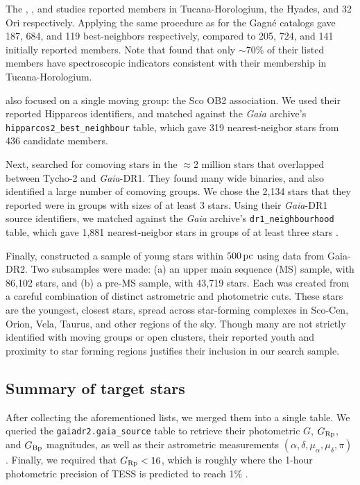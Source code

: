 \documentclass[12pt,twocolumn,tighten]{aastex62}
\begin{document}
The \citet{kraus_tucanahor_2014}, \citet{roser_deep_2011}, and
\citet{bell_32ori_2017} studies reported members in Tucana-Horologium,
the Hyades, and 32$\,$Ori respectively.  Applying the same procedure as
for the Gagn\'e catalogs gave 187, 684, and 119 best-neighbors
respectively, compared to 205, 724, and 141 initially reported
members.  Note that \citet{kraus_tucanahor_2014} found that only
$\sim$70\% of their listed members have spectroscopic indicators
consistent with their membership in Tucana-Horologium.

\citet{rizzuto_multidimensional_2011} also focused on a single moving
group: the Sco OB2 association. We used their reported Hipparcos
identifiers, and matched against the {\it Gaia} archive's
\texttt{hipparcos2\_best\_neighbour} table, which gave 319
nearest-neigbor stars from 436 candidate members.

Next, \citet{oh_comoving_2017} searched for comoving stars in the
$\approx$2 million stars that overlapped between Tycho-2 and {\it
Gaia}-DR1.  They found many wide binaries, and also identified a large
number of comoving groups.  We chose the 2{,}134 stars that they
reported were in groups with sizes of at least 3 stars.  Using their
{\it Gaia}-DR1 source identifiers, we matched against the {\it Gaia}
archive's \texttt{dr1\_neighbourhood} table, which gave 1{,}881
nearest-neigbor stars in groups of at least three stars
\citep{marrese_gaia_2019}.

Finally, \citet{zari_3d_2018} constructed a sample of young stars
within $500\,{\rm pc}$ using data from Gaia-DR2. Two subsamples were
made: (a) an upper main sequence (MS) sample, with 86{,}102 stars, and
(b) a pre-MS sample, with 43{,}719 stars.  Each was created from a
careful combination of distinct astrometric and photometric cuts.
These stars are the youngest, closest stars, spread across
star-forming complexes in Sco-Cen, Orion, Vela, Taurus, and other
regions of the sky.  Though many are not strictly identified with
moving groups or open clusters, their reported youth and proximity to star
forming regions justifies their inclusion in our search sample.




\subsection{Summary of target stars}
\label{subsec:ocmgsummary}


After collecting the aforementioned lists, we merged them into a
single table. We queried the \texttt{gaiadr2.gaia\_source} table to
retrieve their photometric $G$, $G_{\rm Rp}$, and $G_{\rm Bp}$
magnitudes, as well as their astrometric measurements $(\alpha,
\delta, \mu_\alpha, \mu_\delta, \pi)$.  Finally, we required that
$G_{\rm Rp} < 16$, which is roughly where the 1-hour photometric
precision of TESS is predicted to reach 1\%
\citep{ricker_transiting_2015}.
\end{document}
